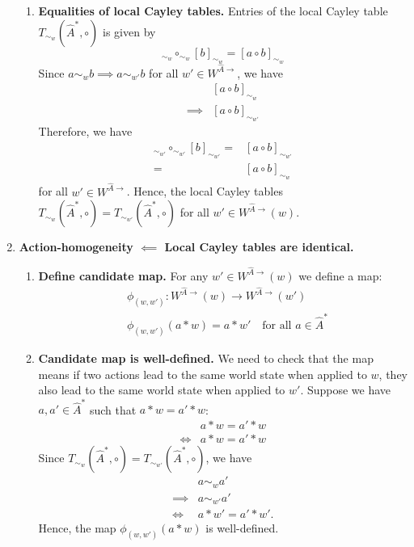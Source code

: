 \begin{proofE}
\begin{enumerate}[(1)]
\begin{enumerate}
    \item \textbf{Equalities of local Cayley tables.}
    Entries of the local Cayley table $T_{\sim_{w}}(\hat{A}^{*}, \circ)$ is given by
    \begin{equation}
        [a]_{\sim_{w}} \circ_{\sim_{w}} [b]_{\sim_{w}} = [a \circ b]_{\sim_{w}}
    \end{equation}
    Since $a \sim_{w} b \implies a \sim_{w'} b$ for all $w' \in W^{\hat{A}\to}$, we have
    \begin{align}
        & [a \circ b]_{\sim_{w}} \\
        \implies & [a \circ b]_{\sim_{w'}}
    \end{align}
    Therefore, we have
    \begin{align}
        [a]_{\sim_{w'}} \circ_{\sim_{w'}} [b]_{\sim_{w'}} = & [a \circ b]_{\sim_{w'}} \\
        = & [a \circ b]_{\sim_{w}}
    \end{align}
    for all $w' \in W^{\hat{A}\to}$.
    Hence, the local Cayley tables $T_{\sim_{w}}(\hat{A}^{*}, \circ) = T_{\sim_{w'}}(\hat{A}^{*}, \circ)$ for all $w' \in W^{\hat{A}\to}(w)$.
    \end{enumerate}
    
    \item \textbf{Action-homogeneity $\impliedby$ Local Cayley tables are identical.}
    \begin{enumerate}
        \item \textbf{Define candidate map.}
        For any $w' \in W^{\hat{A}\to}(w)$ we define a map:
        \begin{equation}
        \begin{aligned}
            & \phi_{(w, w')}: W^{\hat{A}\to}(w) \to W^{\hat{A}\to}(w') \\
            & \phi_{(w, w')}(a \ast w) = a \ast w' \quad \text{for all $a \in \hat{A}^{*}$}
        \end{aligned}
        \end{equation}

        \item \textbf{Candidate map is well-defined.}
        We need to check that the map means if two actions lead to the same world state when applied to $w$, they also lead to the same world state when applied to $w'$.
        Suppose we have $a, a' \in \hat{A}^{*}$ such that $a \ast w = a' \ast w$:
        \begin{align}
            & a \ast w = a' \ast w \\
            \iff & a \ast w = a' \ast w
        \end{align}
        Since $T_{\sim_{w}}(\hat{A}^{*}, \circ) = T_{\sim_{w'}}(\hat{A}^{*}, \circ)$, we have
        \begin{align}
            & a \sim_{w} a' \\
            \implies & a \sim_{w'} a' \\
            \iff & a \ast w' = a' \ast w'.
        \end{align}
        Hence, the map $\phi_{(w, w')}(a \ast w)$ is well-defined.


\end{enumerate}
\end{enumerate}
\end{proofE}
